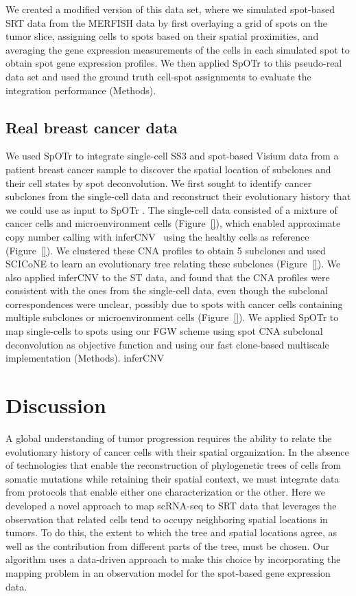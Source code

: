 \documentclass{article}
\newcommand{\toolnamex}{SpOTr }
\begin{document}
We created a modified version of this data set, where we simulated spot-based SRT data from the MERFISH data by first overlaying a grid of spots on the tumor slice, assigning cells to spots based on their spatial proximities, and averaging the gene expression measurements of the cells in each simulated spot to obtain spot gene expression profiles. We then applied \toolnamex to this pseudo-real data set and used the ground truth cell-spot assignments to evaluate the integration performance (Methods). 

\subsection*{Real breast cancer data}
We used \toolnamex to integrate single-cell SS3 and spot-based Visium data from a patient breast cancer sample to discover the spatial location of subclones and their cell states by spot deconvolution. We first sought to identify cancer subclones from the single-cell data and reconstruct their evolutionary history that we could use as input to \toolnamex. The single-cell data consisted of a mixture of cancer cells and microenvironment cells (Figure~\ref{}), which enabled approximate copy number calling with inferCNV~\cite{patel2014single} using the healthy cells as reference (Figure~\ref{}). We clustered these CNA profiles to obtain 5 subclones and used SCICoNE to learn an evolutionary tree relating these subclones (Figure~\ref{}). We also applied inferCNV to the ST data, and found that the CNA profiles were consistent with the ones from the single-cell data, even though the subclonal correspondences were unclear, possibly due to spots with cancer cells containing multiple subclones or microenvironment cells (Figure~\ref{}). 
We applied \toolnamex to map single-cells to spots using our FGW scheme using spot CNA subclonal deconvolution as objective function and using our fast clone-based multiscale implementation (Methods). inferCNV




\section*{Discussion}
\label{sec:discussion}

A global understanding of tumor progression requires the ability to relate the evolutionary history of cancer cells with their spatial organization. In the absence of technologies that enable the reconstruction of phylogenetic trees of cells from somatic mutations while retaining their spatial context, we must integrate data from protocols that enable either one characterization or the other. Here we developed a novel approach to map scRNA-seq to SRT data that leverages the observation that related cells tend to occupy neighboring spatial locations in tumors. To do this, the extent to which the tree and spatial locations agree, as well as the contribution from different parts of the tree, must be chosen. Our algorithm uses a data-driven approach to make this choice by incorporating the mapping problem in an observation model for the spot-based gene expression data.
\end{document}
